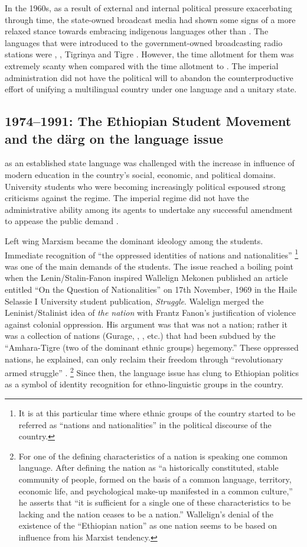 \documentclass[output=paper,modfonts]{langscibook}
\begin{document}
In the 1960s, as a result of external and internal political pressure exacerbating through time, the state-owned broadcast media had shown some signs of a more relaxed stance towards embracing indigenous languages other than . The languages that were introduced to the government-owned broadcasting radio stations were , , Tigrinya and Tigre \citep{Smith2008}. However, the time allotment for them was extremely scanty when compared with the time allotment to . The imperial administration did not have the political will to abandon the counterproductive effort of unifying a multilingual country under one language and a unitary state.
 
\subsection{1974--1991: The Ethiopian Student Movement and the därg on the language issue}
 

 as an established state language was challenged with the increase in influence of modern education in the country’s social, economic, and political domains. University students who were becoming increasingly political espoused strong criticisms against the regime. The imperial regime did not have the administrative ability among its agents to undertake any successful amendment to appease the public demand \citep{Bahru2002}.

Left wing Marxism became the dominant ideology among the students. Immediate recognition of “the oppressed identities of nations and nationalities”{} \footnote{It is at this particular time where ethnic groups of the country started to be referred as “nations and nationalities” in the political discourse of the country.} was one of the main demands of the students. The issue reached a boiling point when the Lenin/Stalin-Fanon inspired Wallelign Mekonen published an article entitled “On the Question of Nationalities” on 17th November, 1969 in the Haile Selassie I University student publication, \textit{Struggle}. Walelign merged the Leninist/Stalinist idea of \textit{the nation} with Frantz Fanon’s justification of violence against colonial oppression. His argument was that  was not a nation; rather it was a collection of nations (Gurage, , , etc.) that had been subdued by the “Amhara-Tigre (two of the dominant ethnic groups) hegemony.” These oppressed nations, he explained, can only reclaim their freedom through “revolutionary armed struggle” \citep{Walelign1969}.{} \footnote{For \citet{Stalin1913} one of the defining characteristics of a nation is speaking one common language. After defining the nation as “a historically constituted, stable community of people, formed on the basis of a common language, territory, economic life, and psychological make-up manifested in a common culture,” he asserts that “it is sufficient for a single one of these characteristics to be lacking and the nation ceases to be a nation.” Wallelign’s denial of the existence of the “Ethiopian nation” as one nation seems to be based on influence from his Marxist tendency.} Since then, the language issue has clung to Ethiopian politics as a symbol of identity recognition for ethno-linguistic groups in the country.
\end{document}
